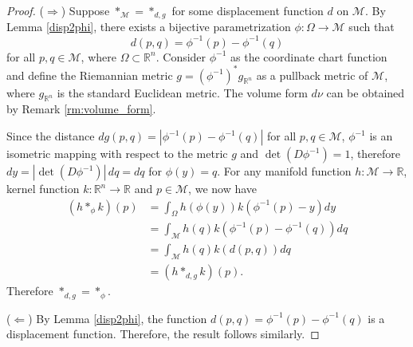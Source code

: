 \begin{proof}
    ($\Rightarrow$) Suppose $*_\mathcal{M} = *_{d,g}$ for some displacement function $d$ on $\mathcal{M}$. By Lemma \ref{disp2phi}, there exists a bijective parametrization $\phi: \Omega \to \mathcal{M}$ such that $$d(p,q) = \phi^{-1}(p)-\phi^{-1}(q)$$ for all $p, q \in \mathcal{M}$, where $\Omega \subset \mathbb{R}^n$. Consider $\phi^{-1}$ as the coordinate chart function and define the Riemannian metric $g = (\phi^{-1})^*g_{\mathbb{R}^n}$ as a pullback metric of $\mathcal{M}$, where $g_{\mathbb{R}^n}$ is the standard Euclidean metric. The volume form $d\nu$ can be obtained by Remark \ref{rm:volume_form}. 
    
    Since the distance $dg(p,q) = |\phi^{-1}(p)-\phi^{-1}(q)|$ for all $p,q \in \mathcal{M}$, $\phi^{-1}$ is an isometric mapping with respect to the metric $g$ and $\det(D\phi^{-1}) = 1$, therefore $dy = |\det(D\phi^{-1})| \, dq = dq$ for $\phi(y) = q$. For any manifold function $h:\mathcal{M} \to \mathbb{R}$, kernel function $k: \mathbb{R}^n \to \mathbb{R}$ and $p \in \mathcal{M}$, we now have 
    \begin{equation}
        \begin{aligned}
            (h *_\phi k)(p) &= \int_\Omega h(\phi(y))k(\phi^{-1}(p)-y)dy \\
            &= \int_\mathcal{M} h(q)k(\phi^{-1}(p)-\phi^{-1}(q))dq \\
            &= \int_\mathcal{M} h(q)k(d(p,q))dq \\
            &= (h *_{d,g} k)(p).
        \end{aligned}
    \end{equation}
    Therefore $*_{d, g} = *_\phi$.

    ($\Leftarrow$) By Lemma \ref{disp2phi}, the function $d(p,q) = \phi^{-1}(p)-\phi^{-1}(q)$ is a displacement function. Therefore, the result follows similarly.
\end{proof}






